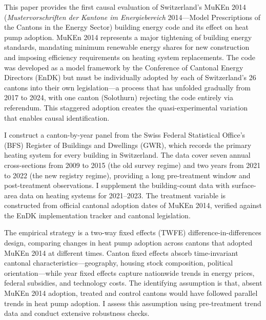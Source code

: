 \documentclass[12pt]{article}
\begin{document}
This paper provides the first causal evaluation of Switzerland's MuKEn 2014 (\textit{Mustervorschriften der Kantone im Energiebereich} 2014---Model Prescriptions of the Cantons in the Energy Sector) building energy code and its effect on heat pump adoption. MuKEn 2014 represents a major tightening of building energy standards, mandating minimum renewable energy shares for new construction and imposing efficiency requirements on heating system replacements. The code was developed as a model framework by the Conference of Cantonal Energy Directors (EnDK) but must be individually adopted by each of Switzerland's 26 cantons into their own legislation---a process that has unfolded gradually from 2017 to 2024, with one canton (Solothurn) rejecting the code entirely via referendum. This staggered adoption creates the quasi-experimental variation that enables causal identification.

I construct a canton-by-year panel from the Swiss Federal Statistical Office's (BFS) Register of Buildings and Dwellings (GWR), which records the primary heating system for every building in Switzerland. The data cover seven annual cross-sections from 2009 to 2015 (the old survey regime) and two years from 2021 to 2022 (the new registry regime), providing a long pre-treatment window and post-treatment observations. I supplement the building-count data with surface-area data on heating systems for 2021--2023. The treatment variable is constructed from official cantonal adoption dates of MuKEn 2014, verified against the EnDK implementation tracker and cantonal legislation.

The empirical strategy is a two-way fixed effects (TWFE) difference-in-differences design, comparing changes in heat pump adoption across cantons that adopted MuKEn 2014 at different times. Canton fixed effects absorb time-invariant cantonal characteristics---geography, housing stock composition, political orientation---while year fixed effects capture nationwide trends in energy prices, federal subsidies, and technology costs. The identifying assumption is that, absent MuKEn 2014 adoption, treated and control cantons would have followed parallel trends in heat pump adoption. I assess this assumption using pre-treatment trend data and conduct extensive robustness checks.
\end{document}
